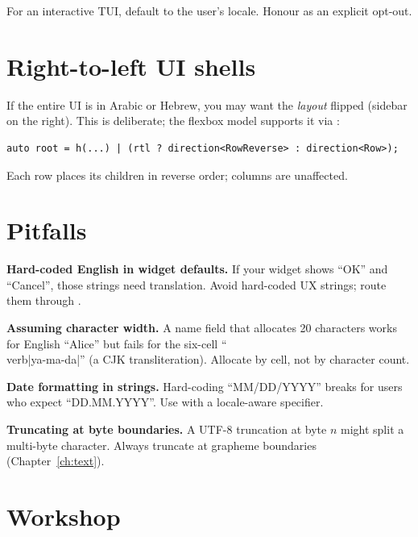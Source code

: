 For an interactive TUI, default to the user's locale. Honour
 as an explicit opt-out.

\section{Right-to-left UI shells}

If the entire UI is in Arabic or Hebrew, you may want the
\emph{layout} flipped (sidebar on the right). This is
deliberate; the flexbox model supports it via
:

\begin{lstlisting}
auto root = h(...) | (rtl ? direction<RowReverse> : direction<Row>);
\end{lstlisting}

Each row places its children in reverse order; columns are
unaffected.

\section{Pitfalls}

\begin{warning}
\textbf{Hard-coded English in widget defaults.} If your
widget shows ``OK'' and ``Cancel'', those strings need
translation. Avoid hard-coded UX strings; route them through
\code{\_(\ldots)}.
\end{warning}

\begin{warning}
\textbf{Assuming character width.} A name field that allocates
20 characters works for English ``Alice'' but fails for the
six-cell ``\\verb|ya-ma-da|'' (a CJK transliteration). Allocate
by cell, not by character count.
\end{warning}

\begin{warning}
\textbf{Date formatting in strings.} Hard-coding ``MM/DD/YYYY''
breaks for users who expect ``DD.MM.YYYY''. Use
 with a locale-aware specifier.
\end{warning}

\begin{warning}
\textbf{Truncating at byte boundaries.} A UTF-8 truncation at
byte $n$ might split a multi-byte character. Always truncate at
grapheme boundaries (Chapter~\ref{ch:text}).
\end{warning}

\section*{Workshop}

